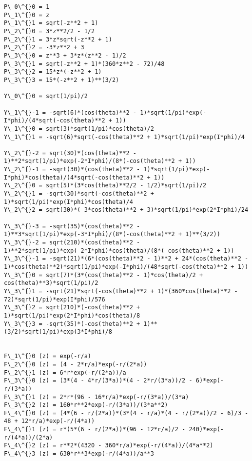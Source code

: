 \documentclass[11pt]{article}
\begin{document}
    \begin{Verbatim}[commandchars=\\\{\}]
P\_0\^{}0 = 1
P\_1\^{}0 = z
P\_1\^{}1 = sqrt(-z**2 + 1)
P\_2\^{}0 = 3*z**2/2 - 1/2
P\_2\^{}1 = 3*z*sqrt(-z**2 + 1)
P\_2\^{}2 = -3*z**2 + 3
P\_3\^{}0 = z**3 + 3*z*(z**2 - 1)/2
P\_3\^{}1 = sqrt(-z**2 + 1)*(360*z**2 - 72)/48
P\_3\^{}2 = 15*z*(-z**2 + 1)
P\_3\^{}3 = 15*(-z**2 + 1)**(3/2)

Y\_0\^{}0 = sqrt(1/pi)/2

Y\_1\^{}-1 = -sqrt(6)*(cos(theta)**2 - 1)*sqrt(1/pi)*exp(-I*phi)/(4*sqrt(-cos(theta)**2 + 1))
Y\_1\^{}0 = sqrt(3)*sqrt(1/pi)*cos(theta)/2
Y\_1\^{}1 = -sqrt(6)*sqrt(-cos(theta)**2 + 1)*sqrt(1/pi)*exp(I*phi)/4

Y\_2\^{}-2 = sqrt(30)*(cos(theta)**2 - 1)**2*sqrt(1/pi)*exp(-2*I*phi)/(8*(-cos(theta)**2 + 1))
Y\_2\^{}-1 = -sqrt(30)*(cos(theta)**2 - 1)*sqrt(1/pi)*exp(-I*phi)*cos(theta)/(4*sqrt(-cos(theta)**2 + 1))
Y\_2\^{}0 = sqrt(5)*(3*cos(theta)**2/2 - 1/2)*sqrt(1/pi)/2
Y\_2\^{}1 = -sqrt(30)*sqrt(-cos(theta)**2 + 1)*sqrt(1/pi)*exp(I*phi)*cos(theta)/4
Y\_2\^{}2 = sqrt(30)*(-3*cos(theta)**2 + 3)*sqrt(1/pi)*exp(2*I*phi)/24

Y\_3\^{}-3 = -sqrt(35)*(cos(theta)**2 - 1)**3*sqrt(1/pi)*exp(-3*I*phi)/(8*(-cos(theta)**2 + 1)**(3/2))
Y\_3\^{}-2 = sqrt(210)*(cos(theta)**2 - 1)**2*sqrt(1/pi)*exp(-2*I*phi)*cos(theta)/(8*(-cos(theta)**2 + 1))
Y\_3\^{}-1 = -sqrt(21)*(6*(cos(theta)**2 - 1)**2 + 24*(cos(theta)**2 - 1)*cos(theta)**2)*sqrt(1/pi)*exp(-I*phi)/(48*sqrt(-cos(theta)**2 + 1))
Y\_3\^{}0 = sqrt(7)*(3*(cos(theta)**2 - 1)*cos(theta)/2 + cos(theta)**3)*sqrt(1/pi)/2
Y\_3\^{}1 = -sqrt(21)*sqrt(-cos(theta)**2 + 1)*(360*cos(theta)**2 - 72)*sqrt(1/pi)*exp(I*phi)/576
Y\_3\^{}2 = sqrt(210)*(-cos(theta)**2 + 1)*sqrt(1/pi)*exp(2*I*phi)*cos(theta)/8
Y\_3\^{}3 = -sqrt(35)*(-cos(theta)**2 + 1)**(3/2)*sqrt(1/pi)*exp(3*I*phi)/8


F\_1\^{}0 (z) = exp(-r/a)
F\_2\^{}0 (z) = (4 - 2*r/a)*exp(-r/(2*a))
F\_2\^{}1 (z) = 6*r*exp(-r/(2*a))/a
F\_3\^{}0 (z) = (3*(4 - 4*r/(3*a))*(4 - 2*r/(3*a))/2 - 6)*exp(-r/(3*a))
F\_3\^{}1 (z) = 2*r*(96 - 16*r/a)*exp(-r/(3*a))/(3*a)
F\_3\^{}2 (z) = 160*r**2*exp(-r/(3*a))/(3*a**2)
F\_4\^{}0 (z) = (4*(6 - r/(2*a))*(3*(4 - r/a)*(4 - r/(2*a))/2 - 6)/3 - 48 + 12*r/a)*exp(-r/(4*a))
F\_4\^{}1 (z) = r*(5*(6 - r/(2*a))*(96 - 12*r/a)/2 - 240)*exp(-r/(4*a))/(2*a)
F\_4\^{}2 (z) = r**2*(4320 - 360*r/a)*exp(-r/(4*a))/(4*a**2)
F\_4\^{}3 (z) = 630*r**3*exp(-r/(4*a))/a**3

    \end{Verbatim}
\end{document}

